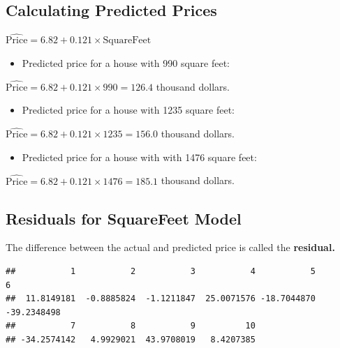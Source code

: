 \documentclass[]{book}
\newenvironment{Shaded}{\begin{snugshade}}{\end{snugshade}}
\newcommand{\OperatorTok}[1]{\textcolor[rgb]{0.81,0.36,0.00}{\textbf{#1}}}
\newcommand{\NormalTok}[1]{#1}
\providecommand{\tightlist}{%
  \setlength{\itemsep}{0pt}\setlength{\parskip}{0pt}}
\begin{document}
\subsection{Calculating Predicted
Prices}\label{calculating-predicted-prices}

\(\widehat{\text{Price}}= 6.82+ 0.121 \times\text{SquareFeet}\)

\begin{itemize}
\tightlist
\item
  Predicted price for a house with 990 square feet:
\end{itemize}

\(\widehat{\text{Price}}= 6.82+ 0.121 \times990 = 126.4\) thousand
dollars.

\begin{itemize}
\tightlist
\item
  Predicted price for a house with 1235 square feet:
\end{itemize}

\(\widehat{\text{Price}}= 6.82+ 0.121 \times1235 = 156.0\) thousand
dollars.

\begin{itemize}
\tightlist
\item
  Predicted price for a house with with 1476 square feet:
\end{itemize}

\(\widehat{\text{Price}}= 6.82+ 0.121 \times1476 = 185.1\) thousand
dollars.

\subsection{Residuals for SquareFeet
Model}\label{residuals-for-squarefeet-model}

The difference between the actual and predicted price is called the
\textbf{residual.}

\begin{Shaded}
\end{Shaded}

\begin{verbatim}
##           1           2           3           4           5           6 
##  11.8149181  -0.8885824  -1.1211847  25.0071576 -18.7044870 -39.2348498 
##           7           8           9          10 
## -34.2574142   4.9929021  43.9708019   8.4207385
\end{verbatim}
\end{document}
